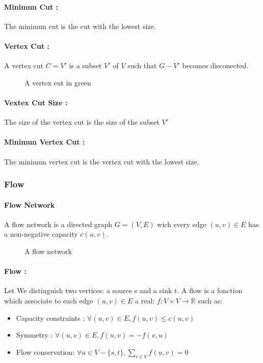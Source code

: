 \paragraph{Minimun Cut :} 
The minimun cut is the cut with the lowest size. 

\paragraph{Vertex Cut :}
A vertex cut $C=V'$ is a subset $V'$ of $V$ such that $G-V'$ becomes disconected.

\begin{figure}[!h]
  \begin{center}
    
  \end{center}
  \caption{A vertex cut in green}
\end{figure}


\paragraph{Vextex Cut Size :}
The size of the  vertex cut is the size of the subset $V'$

\paragraph{Minimun Vertex Cut :}
The minimun vertex cut is the vertex cut with the lowest size.

\subsubsection{Flow}
\paragraph{Flow Network}
A flow network is a directed graph $G=(V,E)$ wich every edge $(u,v) \in E$ has a non-negative capacity $c(u,v)$.

\begin{figure}[!h]
  \begin{center}
    
  \end{center}
  \caption{A flow network}
\end{figure}

\paragraph{Flow :}
Let We distinguish two vertices: a source s and a sink t.
A flow is a fonction which associate to each edge $(u,v) \in E$ a real: $f: V \times V \rightarrow \mathbb{R}$ such as:
\begin{itemize}
    \item Capacity constraints : $\forall (u,v) \in E, f(u,v) \leq c(u,v)$
    \item Symmetry : $\forall (u,v) \in E, f(u,v) = - f(v,u) $
    \item Flow conservation: $\forall u \in V - \{s,t\}, \sum_{v \in V}f(u,v) = 0$ 
\end{itemize}


